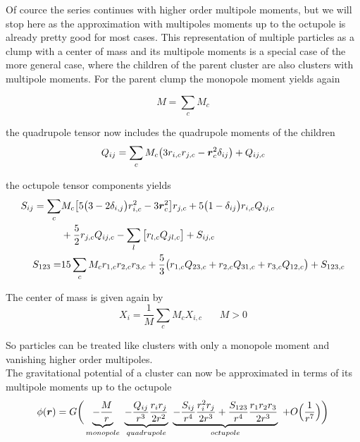 Of cource the series continues with higher order multipole moments, but we will stop here as the approximation with multipoles moments up to the octupole is already pretty good for most cases. This representation of multiple particles as a clump with a center of mass and its multipole moments is a special case of the more general case, where the children of the parent cluster are also clusters with multipole moments. For the parent clump the monopole moment yields again

\begin{equation}
\label{eq_monopole}
M = \sum_{c} M_{c}
\end{equation}

the quadrupole tensor now includes the quadrupole moments of the children 
\begin{equation}
\label{eq_quadrupole}
Q_{ij} = \sum_{c} M_{c} \big( 3 r_{i, c} r_{j, c} - \boldsymbol{r}_{c}^{2} \delta_{i j} \big) + Q_{i j, c} 
\end{equation}

the octupole tensor components yields
\begin{align}
\label{eq_octupole}
S_{ij} = \sum_{c}&  M_{c} \big[ 5 \big( 3 - 2 \delta_{i,j} \big) r_{i, c}^{2} - 3 \boldsymbol{r}_{c}^2 \big] r_{j, c} 
+ 5 \big( 1 - \delta_{i j} \big) r_{i, c} Q_{i j, c} \nonumber \\
&+ \frac{5}{2} r_{j, c} Q_{i j, c} - \sum_{l} \big[ r_{l, c} Q_{j l, c} \big] + S_{i j, c} \\
S_{1 2 3} =& 15 \sum_{c} M_{c} r_{1, c} r_{2, c} r_{3, c} + \frac{5}{3} \big( r_{1, c} Q_{2 3, c} + r_{2, c} Q_{3 1, c} + r_{3, c} Q_{1 2, c} \big) + S_{1 2 3, c }
\end{align}

The center of mass is given again by
\begin{equation}
X_{i} = \frac{1}{M} \sum_{c} M_{c} X_{i, c} ~~~~~~~~  M > 0
\end{equation}

So particles can be treated like clusters with only a monopole moment and vanishing higher order multipoles.\\

The gravitational potential of a cluster can now be approximated in terms of its multipole moments up to the octupole
\begin{equation}
\phi(\boldsymbol{r}) = G \bigg(
\underbrace{ - \frac{M}{r} }_{monopole} ~ 
\underbrace{ - \frac{Q_{i j}}{r^{3}} \frac{r_{i} r_{j} }{2 r^{2} } }_{quadrupole}~ 
\underbrace{ - \frac{S_{i j}}{r^{4}} \frac{r_{i}^2 r_{j}}{2 r^{3} } + \frac{ S_{1 2 3} }{r^{4}}\frac{ r_{1} r_{2} r_{3} }{2 r^{3}} }_{octupole}~ 
+ O\Big(\frac{1}{r^{7}}\Big) \bigg)
\end{equation}

